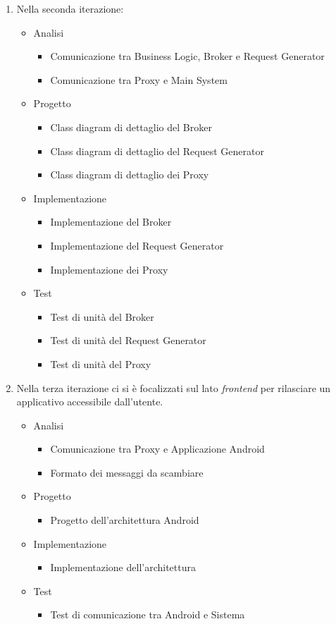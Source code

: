 \begin{enumerate}
	\item Nella seconda iterazione:
	\begin{itemize}
		\item Analisi
		\begin{itemize}
			\item Comunicazione tra Business Logic, Broker e Request Generator
			\item Comunicazione tra Proxy e Main System
		\end{itemize}
		\item Progetto
		\begin{itemize}
			\item Class diagram di dettaglio del Broker
			\item Class diagram di dettaglio del Request Generator
			\item Class diagram di dettaglio dei Proxy
		\end{itemize}
		\item Implementazione
		\begin{itemize}
			\item Implementazione del Broker
			\item Implementazione del Request Generator
			\item Implementazione dei Proxy
		\end{itemize}
		\item Test
		\begin{itemize}
			\item Test di unità del Broker
			\item Test di unità del Request Generator
			\item Test di unità del Proxy
		\end{itemize}
	\end{itemize}
	\item Nella terza iterazione ci si è focalizzati sul lato \textit{frontend} per rilasciare un applicativo accessibile dall'utente.
		\begin{itemize}
			\item Analisi
			\begin{itemize}
				\item Comunicazione tra Proxy e Applicazione Android
				\item Formato dei messaggi da scambiare
			\end{itemize}
			\item Progetto
			\begin{itemize}
				\item Progetto dell'architettura Android
			\end{itemize}
			\item Implementazione
			\begin{itemize}
				\item Implementazione dell'architettura 
			\end{itemize}
			\item Test
			\begin{itemize}
				\item Test di comunicazione tra Android e Sistema
			\end{itemize}
		\end{itemize}
\end{enumerate}

